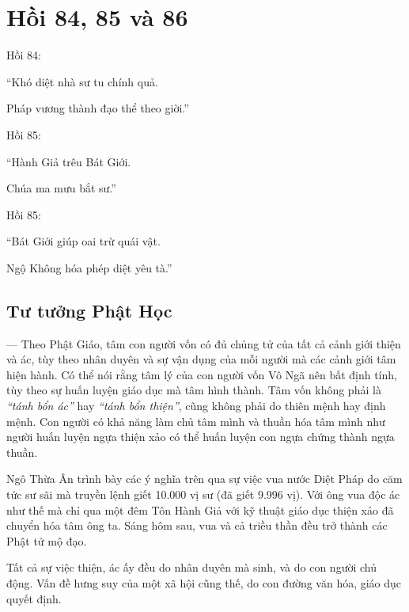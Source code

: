 \chapter{Hồi 84, 85 và 86} %
\label{cha:hoi_84_85}

Hồi 84:

\begin{itshape}
``Khó diệt nhà sư tu chính quả.

Pháp vương thành đạo thể theo giời.''
\end{itshape}

Hồi 85:

\begin{itshape}
``Hành Giả trêu Bát Giới.

Chúa ma mưu bắt sư.''
\end{itshape}

Hồi 85:

\begin{itshape}
``Bát Giới giúp oai trừ quái vật.

Ngộ Không hóa phép diệt yêu tà.''
\end{itshape}

\section{Tư tưởng Phật Học} %
\label{sec:84_85_phat_hoc}

--- Theo Phật Giáo, tâm con người vốn có đủ chủng tử của tất cả cảnh giới thiện và ác, tùy theo nhân duyên và sự vận dụng của mỗi người mà các cảnh giới tâm hiện hành. Có thể nói rằng tâm lý của con người vốn Vô Ngã nên bất định tính, tùy theo sự huấn luyện giáo dục mà tâm hình thành. Tâm vốn không phải là \emph{``tánh bổn ác''} hay \emph{``tánh bổn thiện''}, cũng không phải do thiên mệnh hay định mệnh. Con người có khả năng làm chủ tâm mình và thuần hóa tâm mình như người huấn luyện ngựa thiện xảo có thể huấn luyện con ngựa chứng thành ngựa thuần.

Ngô Thừa Ân trình bày các ý nghĩa trên qua sự việc vua nước Diệt Pháp do căm tức sư sãi mà truyền lệnh giết 10.000 vị sư (đã giết 9.996 vị). Với ông vua độc ác như thế mà chỉ qua một đêm Tôn Hành Giả với kỹ thuật giáo dục thiện xảo đã chuyển hóa tâm ông ta. Sáng hôm sau, vua và cả triều thần đều trở thành các Phật tử mộ đạo.

Tất cả sự việc thiện, ác ấy đều do nhân duyên mà sinh, và do con người chủ động. Vấn đề hưng suy của một xã hội cũng thế, do con đường văn hóa, giáo dục quyết định.

